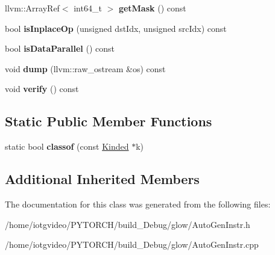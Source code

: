 \begin{DoxyCompactItemize}
llvm\+::\+Array\+Ref$<$ int64\+\_\+t $>$ {\bfseries get\+Mask} () const
\item 
\mbox{\label{classglow_1_1_sparse_to_dense_mask_inst_ad4db8eed3a5fb87455ce047d1c818f19}} 
bool {\bfseries is\+Inplace\+Op} (unsigned dst\+Idx, unsigned src\+Idx) const
\item 
\mbox{\label{classglow_1_1_sparse_to_dense_mask_inst_ae798be931290f0d36620f8fa099c59ea}} 
bool {\bfseries is\+Data\+Parallel} () const
\item 
\mbox{\label{classglow_1_1_sparse_to_dense_mask_inst_a7717996280f8491cef2778ee1e26ffc2}} 
void {\bfseries dump} (llvm\+::raw\+\_\+ostream \&os) const
\item 
\mbox{\label{classglow_1_1_sparse_to_dense_mask_inst_af8e6da58a22953bed252f7b49ee0d943}} 
void {\bfseries verify} () const
\end{DoxyCompactItemize}
\subsection*{Static Public Member Functions}
\begin{DoxyCompactItemize}
\item 
\mbox{\label{classglow_1_1_sparse_to_dense_mask_inst_a21fffffc600eea9e0dcfaff088ee9d97}} 
static bool {\bfseries classof} (const \hyperlink{classglow_1_1_kinded}{Kinded} $\ast$k)
\end{DoxyCompactItemize}
\subsection*{Additional Inherited Members}


The documentation for this class was generated from the following files\+:\begin{DoxyCompactItemize}
\item 
/home/iotgvideo/\+P\+Y\+T\+O\+R\+C\+H/build\+\_\+\+Debug/glow/Auto\+Gen\+Instr.\+h\item 
/home/iotgvideo/\+P\+Y\+T\+O\+R\+C\+H/build\+\_\+\+Debug/glow/Auto\+Gen\+Instr.\+cpp\end{DoxyCompactItemize}
